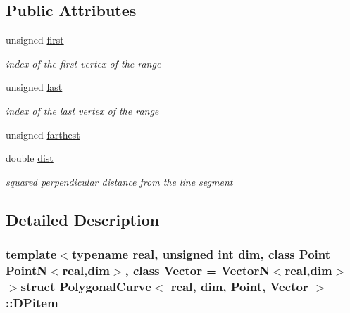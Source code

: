 \subsection*{Public Attributes}
\begin{DoxyCompactItemize}
\item 
\hypertarget{structPolygonalCurve_1_1DPitem_af53f3be5120386c8df25c6ff2283d2e9}{
unsigned \hyperlink{structPolygonalCurve_1_1DPitem_af53f3be5120386c8df25c6ff2283d2e9}{first}}
\label{structPolygonalCurve_1_1DPitem_af53f3be5120386c8df25c6ff2283d2e9}

\begin{DoxyCompactList}\small\item\em index of the first vertex of the range \end{DoxyCompactList}\item 
\hypertarget{structPolygonalCurve_1_1DPitem_ad13567bd2031902289e8ff928a227a95}{
unsigned \hyperlink{structPolygonalCurve_1_1DPitem_ad13567bd2031902289e8ff928a227a95}{last}}
\label{structPolygonalCurve_1_1DPitem_ad13567bd2031902289e8ff928a227a95}

\begin{DoxyCompactList}\small\item\em index of the last vertex of the range \end{DoxyCompactList}\item 
unsigned \hyperlink{structPolygonalCurve_1_1DPitem_a08cfeb2a6ec60cab38547705e132e36c}{farthest}
\item 
\hypertarget{structPolygonalCurve_1_1DPitem_a7d29594a956d56a171f48f6d3251fd2c}{
double \hyperlink{structPolygonalCurve_1_1DPitem_a7d29594a956d56a171f48f6d3251fd2c}{dist}}
\label{structPolygonalCurve_1_1DPitem_a7d29594a956d56a171f48f6d3251fd2c}

\begin{DoxyCompactList}\small\item\em squared perpendicular distance from the line segment \end{DoxyCompactList}\end{DoxyCompactItemize}


\subsection{Detailed Description}
\subsubsection*{template$<$typename real, unsigned int dim, class Point = PointN$<$real,dim$>$, class Vector = VectorN$<$real,dim$>$$>$struct PolygonalCurve$<$ real, dim, Point, Vector $>$::DPitem}

